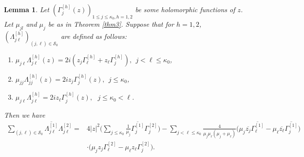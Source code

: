 \documentclass[12pt]{article}
\numberwithin{equation}{section}
\def\ov{\overline}
\newtheorem{lemma}[theorem]{Lemma}
\begin{document}
\begin{lemma}\label{product}
  Let $(\Gamma_{j}^{[h]}(z))_{1\leq j\leq \kappa_0,h=1,2}$ be some
  holomorphic functions of $z$. Let $\mu_{jl}$ and  $\mu_j$ be as in Theorem \ref{thm3}. Suppose that
   for $h=1,2$,  $(\Lambda_{j\ell}^{[h]})_{(j,\ell)\in
  \mathcal{S}_0}$  are defined as follows:
  \begin{enumerate}
\item $\mu_{j \ell} \Lambda^{[h]}_{j \ell}(z) = 2i (z_j \Gamma^{[h]}_\ell + z_\ell
\Gamma^{[h]}_j),\ \ j<\ell \le \kappa_0$,
\item  $\mu_{j j } \Lambda^{[h]}_{j j}(z) = 2i z_j  \Gamma^{[h]}_j (z),\ \ j\le
\kappa_0$,
\item $\mu_{j \ell} \Lambda^{[h]}_{j \ell} = 2i z_\ell \Gamma^{[h]}_j(z),\ \ \ j\le
\kappa_0 < \ell$.
\end{enumerate}
Then we have
\begin{equation}\begin{split}
\sum\limits_{(j,\ell)\in \mathcal{S}_0}\ov{\Lambda^{[1]}_{j
\ell}}\Lambda^{[2]}_{j \ell} =&4|z|^2\Big(\sum_{j\le \kappa_0}
\frac{1}{\mu_j} \ov{\Gamma^{[1]}_j}\Gamma^{[2]}_j \Big)
        -
        \sum_{j < \ell \le \kappa_0}
        \frac{4}{\mu_j \mu_\ell(\mu_j+\mu_\ell)}
        \big(\mu_j\ov{z_j}\ov{\Gamma^{[1]}_\ell}-\mu_\ell\ov{z_\ell}\ov{\Gamma^{[1]}_j}\big)\\
&\cdot \big(\mu_jz_j\Gamma^{[2]}_\ell-\mu_\ell
z_\ell\Gamma^{[2]}_j\big).
\end{split}\end{equation}
\end{lemma}
\end{document}
